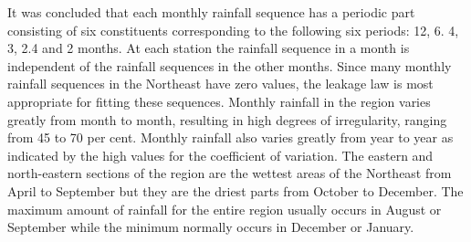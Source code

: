 It was concluded that each monthly rainfall sequence has a periodic part consisting of six constituents corresponding to the following six periods: 12, 6. 4, 3, 2.4 and 2 months.
At each station the rainfall sequence in a month is independent of the rainfall sequences in the other months. Since many monthly rainfall sequences in the Northeast have zero values, the leakage law is most appropriate for fitting these sequences. Monthly rainfall in the region varies greatly from month to month, resulting in high degrees of irregularity, ranging from 45 to 70 per cent. Monthly rainfall also varies greatly from year to year as indicated by the high values for the coefficient of variation. The eastern and north-eastern sections of the region are the wettest areas of the Northeast from April to September but they are the driest parts from October to December. The maximum amount of rainfall for the entire region usually occurs in August or September while the minimum normally occurs in December or January.
